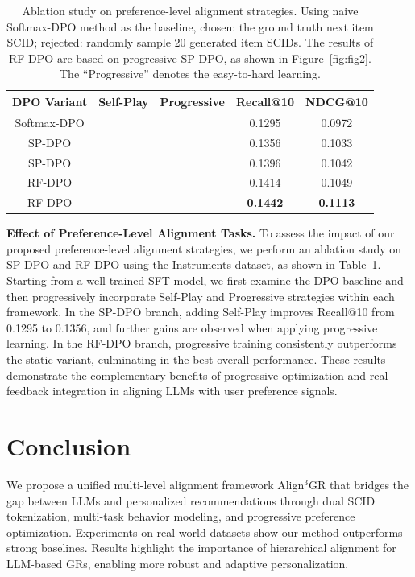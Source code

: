 \documentclass[letterpaper]{article} %
\newcommand{\cmark}{\ding{51}}
\newcommand{\xmark}{\ding{55}}
\begin{document}
%
\begin{table}[t]
\begin{center}
\small
\setlength{\tabcolsep}{2.5pt}
\begin{tabular}{c|cc|cc}
\toprule
\textbf{DPO Variant} & \textbf{Self-Play} & \textbf{Progressive} & \textbf{Recall@10} & \textbf{NDCG@10} \\
\midrule
Softmax-DPO     &  \xmark & \xmark & 0.1295 & 0.0972 \\
\midrule
SP-DPO          &  \cmark & \xmark & 0.1356 & 0.1033 \\
SP-DPO          &  \cmark & \cmark & 0.1396 & 0.1042 \\
\midrule
RF-DPO          &  \cmark & \xmark & 0.1414 & 0.1049 \\
RF-DPO          &  \cmark & \cmark & \textbf{0.1442} & \textbf{0.1113} \\
\bottomrule
\end{tabular}
\end{center}
\caption{Ablation study on preference-level alignment strategies. Using naive Softmax-DPO method as the baseline, chosen: the ground truth next item SCID; rejected: randomly sample 20 generated item SCIDs. The results of RF-DPO are based on progressive SP-DPO, as shown in Figure~\ref{fig:fig2}. The “Progressive” denotes the easy-to-hard learning.
}
\label{tab:ablation_dpo}
\end{table}
%
%
\textbf{Effect of Preference-Level Alignment Tasks.}
To assess the impact of our proposed preference-level alignment strategies, we perform an ablation study on SP-DPO and RF-DPO using the Instruments dataset, as shown in Table~\ref{tab:ablation_dpo}. Starting from a well-trained SFT model, we first examine the DPO baseline and then progressively incorporate Self-Play and Progressive strategies within each framework. 
%
In the SP-DPO branch, adding Self-Play improves Recall@10 from 0.1295 to 0.1356, and further gains are observed when applying progressive learning. In the RF-DPO branch, progressive training consistently outperforms the static variant, culminating in the best overall performance. 
These results demonstrate the complementary benefits of progressive optimization and real feedback integration in aligning LLMs with user preference signals.
%

%
\section{Conclusion}
We propose a unified multi-level alignment framework Align$^3$GR that bridges the gap between LLMs and personalized recommendations through dual SCID tokenization, multi-task behavior modeling, and progressive preference optimization. Experiments on real-world datasets show our method outperforms strong baselines. Results highlight the importance of hierarchical alignment for LLM-based GRs, enabling more robust and adaptive personalization. 
%
%

\end{document}

